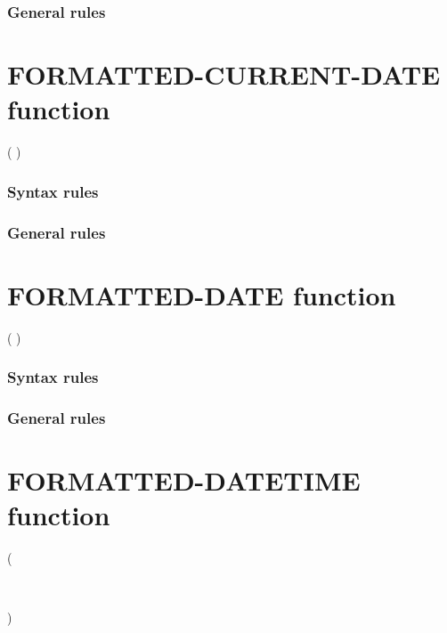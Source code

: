 \subsubsection{General rules}

\section{FORMATTED-CURRENT-DATE function}

\begin{syntax}
    ( \argument )
\end{syntax}

\subsubsection{Syntax rules}

\subsubsection{General rules}

\section{FORMATTED-DATE function}

\begin{syntax}
    ( \argument \argument)
\end{syntax}

\subsubsection{Syntax rules}

\subsubsection{General rules}

\section{FORMATTED-DATETIME function}

\begin{syntax}
   

  ( \argument \argument \argument
  \begin{0-1}
    \argument \\
  \end{0-1}
  )
\end{syntax}


